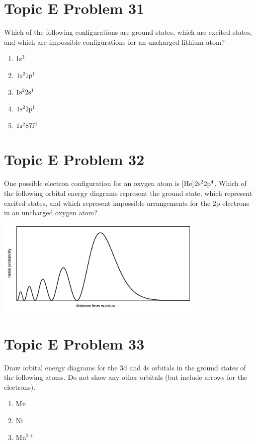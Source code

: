 \documentclass[10pt]{article}
\begin{document}
    \pagebreak
    \section{Topic E Problem 31}
        Which of the following configurations are ground states, which are excited states, and which are impossible configurations for an uncharged lithium atom?
        \begin{multicols}{3}
            \begin{enumerate}
                \item   1s$^3$
                \item   $\rm 1s^2 1p^1$
                \item   $\rm 1s^2 2s^1$
                \item   $\rm 1s^2 2p^1$
                \item   $\rm 1s^2 87f^1$
            \end{enumerate}
        \end{multicols}


    \pagebreak
    \section{Topic E Problem 32}
        One possible electron configuration for an oxygen atom is [He]$\rm 2s^2 2p^4$. 
        Which of the following orbital energy diagrams represent the ground state, which represent excited states, and which represent impossible arrangements for the 2p electrons in an uncharged oxygen atom?
        \begin{center}
            \includegraphics[width=0.75\textwidth]{img-E26.png}
        \end{center}    


    \pagebreak
    \section{Topic E Problem 33}
        Draw orbital energy diagrams for the 3d and 4s orbitals in the ground states of the following atoms. 
        Do not show any other orbitals (but include arrows for the electrons).
        \begin{multicols}{3}
            \begin{enumerate}[label=\alph*)]
                \item   Mn
                \item   Ni
                \item   Mn$^{2+}$
            \end{enumerate}
        \end{multicols}
\end{document}
